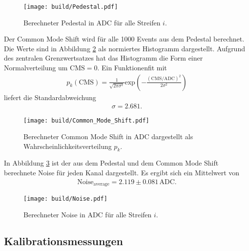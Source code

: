 \begin{figure}
  \centering
  \texttt{[image: build/Pedestal.pdf]}
  \caption{Berechneter Pedestal in ADC für alle Streifen $i$.}
  \label{fig:pedestals}
\end{figure}

Der Common Mode Shift wird für alle 1000 Events aus dem Pedestal berechnet.
Die Werte sind in Abbildung \ref{fig:cms} als normiertes Histogramm dargestellt.
Aufgrund des zentralen Grenzwertsatzes hat das Histogramm die Form einer Normalverteilung um $\text{CMS} = 0$.
Ein Funktionenfit mit
\begin{align}
  p_k(\text{CMS}) = \frac{1}{\sqrt{2 \pi \sigma^2}} \text{exp} \left(-\frac{(\text{CMS}/\text{ADC})^2}{2\sigma^2}\right)
  \label{eqn:gauß}
\end{align}
liefert die Standardabweichung
\begin{align}
  \sigma = 2.681.
\end{align}

\begin{figure}
  \centering
  \texttt{[image: build/Common\_Mode\_Shift.pdf]}
  \caption{Berechneter Common Mode Shift in ADC dargestellt als Wahrscheinlichkeitsverteilung $p_k$.}
  \label{fig:cms}
\end{figure}

In Abbildung \ref{fig:noise} ist der aus dem Pedestal und dem Common Mode Shift berechnete Noise für jeden Kanal
dargestellt. Es ergibt sich ein Mittelwert von
\begin{align}
  \text{Noise}_\text{average} = 2.119 \pm 0.081 \, \text{ADC}.
\end{align}

\begin{figure}
  \centering
  \texttt{[image: build/Noise.pdf]}
  \caption{Berechneter Noise in ADC für alle Streifen $i$.}
  \label{fig:noise}
\end{figure}

\subsection{Kalibrationsmessungen}
\label{sec:kalibration}

